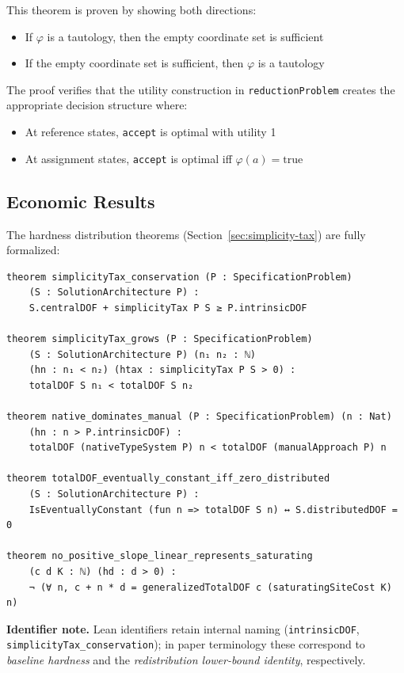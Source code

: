 This theorem is proven by showing both directions:
\begin{itemize}
\item If $\varphi$ is a tautology, then the empty coordinate set is sufficient
\item If the empty coordinate set is sufficient, then $\varphi$ is a tautology
\end{itemize}

The proof verifies that the utility construction in \texttt{reductionProblem} creates the appropriate decision structure where:
\begin{itemize}
\item At reference states, \texttt{accept} is optimal with utility 1
\item At assignment states, \texttt{accept} is optimal iff $\varphi(a) = \text{true}$
\end{itemize}

\subsection{Economic Results}

The hardness distribution theorems (Section~\ref{sec:simplicity-tax}) are fully formalized:

\begin{verbatim}
theorem simplicityTax_conservation (P : SpecificationProblem)
    (S : SolutionArchitecture P) :
    S.centralDOF + simplicityTax P S ≥ P.intrinsicDOF

theorem simplicityTax_grows (P : SpecificationProblem)
    (S : SolutionArchitecture P) (n₁ n₂ : ℕ)
    (hn : n₁ < n₂) (htax : simplicityTax P S > 0) :
    totalDOF S n₁ < totalDOF S n₂

theorem native_dominates_manual (P : SpecificationProblem) (n : Nat)
    (hn : n > P.intrinsicDOF) :
    totalDOF (nativeTypeSystem P) n < totalDOF (manualApproach P) n

theorem totalDOF_eventually_constant_iff_zero_distributed
    (S : SolutionArchitecture P) :
    IsEventuallyConstant (fun n => totalDOF S n) ↔ S.distributedDOF = 0

theorem no_positive_slope_linear_represents_saturating
    (c d K : ℕ) (hd : d > 0) :
    ¬ (∀ n, c + n * d = generalizedTotalDOF c (saturatingSiteCost K) n)
\end{verbatim}

\noindent\textbf{Identifier note.}
Lean identifiers retain internal naming (\texttt{intrinsicDOF}, \texttt{simplicityTax\_conservation}); in paper terminology these correspond to \emph{baseline hardness} and the \emph{redistribution lower-bound identity}, respectively.

